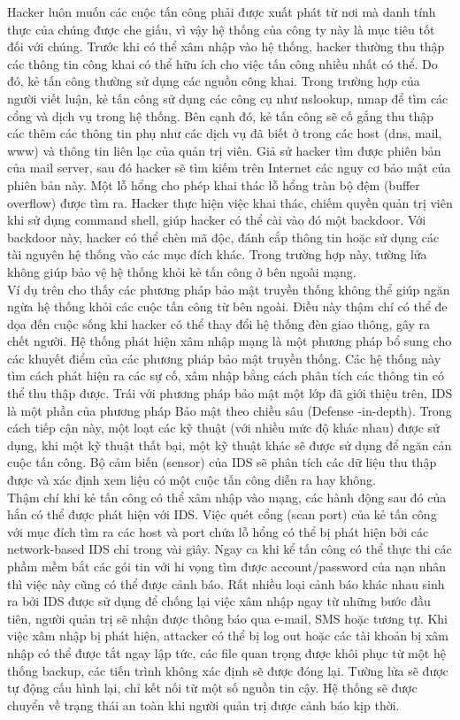 \indent Hacker luôn muốn các cuộc tấn công phải được xuất phát từ nơi mà danh tính thực của chúng được che giấu, vì vậy hệ thống của công ty này là mục tiêu tốt đối với chúng. Trước khi có thể xâm nhập vào hệ thống, hacker thường thu thập các thông tin công khai có thể hữu ích cho việc tấn công nhiều nhất có thể. Do đó, kẻ tấn công thường sử dụng các nguồn công khai. Trong trường hợp của người viết luận, kẻ tấn công sử dụng các công cụ như nslookup, nmap để tìm các cổng và dịch vụ trong hệ thống. Bên cạnh đó, kẻ tấn công sẽ cố gắng thu thập các thêm các thông tin phụ như các dịch vụ đã biết ở trong các host (dns, mail, www) và thông tin liên lạc của quản trị viên. Giả sử hacker tìm được phiên bản của mail server, sau đó hacker sẽ tìm kiếm trên Internet các nguy cơ bảo mật của phiên bản này. Một lỗ hổng cho phép khai thác lỗ hổng tràn bộ đệm (buffer overflow) được tìm ra. Hacker thực hiện việc khai thác, chiếm quyền quản trị viên khi sử dụng command shell, giúp hacker có thể cài vào đó một backdoor. Với backdoor này, hacker có thể chèn mã độc, đánh cắp thông tin hoặc sử dụng các tài nguyên hệ thống vào các mục đích khác. Trong trường hợp này, tường lửa không giúp bảo vệ hệ thống khỏi kẻ tấn công ở bên ngoài mạng.\\
\indent Ví dụ trên cho thấy các phương pháp bảo mật truyền thống không thể giúp ngăn ngừa hệ thống khỏi các cuộc tấn công từ bên ngoài. Điều này thậm chí có thể đe dọa đến cuộc sống khi hacker có thể thay đổi hệ thống đèn giao thông, gây ra chết người. 
Hệ thống phát hiện xâm nhập mạng là một phương pháp bổ sung cho các khuyết điểm của các phương pháp bảo mật truyền thống. Các hệ thống này tìm cách phát hiện ra các sự cố, xâm nhập bằng cách phân tích các thông tin có thể thu thập được. Trái với phương pháp bảo mật một lớp đã giới thiệu trên, IDS là một phần của phương pháp Bảo mật theo chiều sâu (Defense -in-depth). Trong cách tiếp cận này, một loạt các kỹ thuật (với nhiều mức độ khác nhau) được sử dụng, khi một kỹ thuật thất bại, một kỹ thuật khác sẽ được sử dụng để ngăn cản cuộc tấn công. Bộ cảm biến (sensor) của IDS sẽ phân tích các dữ liệu thu thập được và xác định xem liệu có một cuộc tấn công diễn ra hay không. \\

\indent Thậm chí khi kẻ tấn công có thể xâm nhập vào mạng, các hành động sau đó của hắn có thể được phát hiện với IDS. Việc quét cổng (scan port) của kẻ tấn công với mục đích tìm ra các host và port chứa lỗ hổng có thể bị phát hiện bởi các network-based IDS chỉ trong vài giây. Ngay ca khi kể tấn công có thể thực thi các phầm mềm bắt các gói tin với hi vọng tìm được account/password của nạn nhân thì việc này cũng có thể được cảnh báo. 
Rất nhiều loại cảnh báo khác nhau sinh ra bởi IDS được sử dụng để chống lại việc xâm nhập ngay từ những bước đầu tiên, người quản trị sẽ nhận được thông báo qua e-mail, SMS hoặc tương tự. Khi việc xâm nhập bị phát hiện, attacker có thể bị log out hoặc các tài khoản bị xâm nhập có thể được tắt ngay lập tức, các file quan trọng được khôi phục từ một hệ thống backup, các tiến trình không xác định sẽ được đóng lại. Tường lửa sẽ được tự động cấu hình lại, chỉ kết nối từ một số nguồn tin cậy. Hệ thống sẽ được chuyển về trạng thái an toàn khi người quản trị được cảnh báo kịp thời.\\

